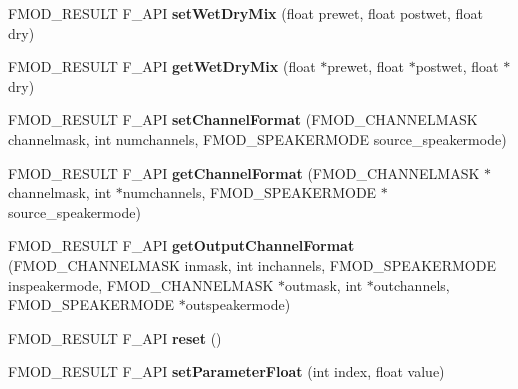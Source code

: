 \begin{DoxyCompactItemize}
\item 
\hypertarget{class_f_m_o_d_1_1_d_s_p_a1070de2d840d88b7fee21aab37016053}{F\+M\+O\+D\+\_\+\+R\+E\+S\+U\+L\+T F\+\_\+\+A\+P\+I {\bfseries set\+Wet\+Dry\+Mix} (float prewet, float postwet, float dry)}\label{class_f_m_o_d_1_1_d_s_p_a1070de2d840d88b7fee21aab37016053}

\item 
\hypertarget{class_f_m_o_d_1_1_d_s_p_a7e0ef3f97f823000de321c7f69c633b0}{F\+M\+O\+D\+\_\+\+R\+E\+S\+U\+L\+T F\+\_\+\+A\+P\+I {\bfseries get\+Wet\+Dry\+Mix} (float $\ast$prewet, float $\ast$postwet, float $\ast$dry)}\label{class_f_m_o_d_1_1_d_s_p_a7e0ef3f97f823000de321c7f69c633b0}

\item 
\hypertarget{class_f_m_o_d_1_1_d_s_p_a1cf7028a5dad21c9b25b0a1c740d9fa2}{F\+M\+O\+D\+\_\+\+R\+E\+S\+U\+L\+T F\+\_\+\+A\+P\+I {\bfseries set\+Channel\+Format} (F\+M\+O\+D\+\_\+\+C\+H\+A\+N\+N\+E\+L\+M\+A\+S\+K channelmask, int numchannels, F\+M\+O\+D\+\_\+\+S\+P\+E\+A\+K\+E\+R\+M\+O\+D\+E source\+\_\+speakermode)}\label{class_f_m_o_d_1_1_d_s_p_a1cf7028a5dad21c9b25b0a1c740d9fa2}

\item 
\hypertarget{class_f_m_o_d_1_1_d_s_p_af8188037563561808d0b4f6b5e1034aa}{F\+M\+O\+D\+\_\+\+R\+E\+S\+U\+L\+T F\+\_\+\+A\+P\+I {\bfseries get\+Channel\+Format} (F\+M\+O\+D\+\_\+\+C\+H\+A\+N\+N\+E\+L\+M\+A\+S\+K $\ast$channelmask, int $\ast$numchannels, F\+M\+O\+D\+\_\+\+S\+P\+E\+A\+K\+E\+R\+M\+O\+D\+E $\ast$source\+\_\+speakermode)}\label{class_f_m_o_d_1_1_d_s_p_af8188037563561808d0b4f6b5e1034aa}

\item 
\hypertarget{class_f_m_o_d_1_1_d_s_p_a51940a26a921a03694ace53f63a92e22}{F\+M\+O\+D\+\_\+\+R\+E\+S\+U\+L\+T F\+\_\+\+A\+P\+I {\bfseries get\+Output\+Channel\+Format} (F\+M\+O\+D\+\_\+\+C\+H\+A\+N\+N\+E\+L\+M\+A\+S\+K inmask, int inchannels, F\+M\+O\+D\+\_\+\+S\+P\+E\+A\+K\+E\+R\+M\+O\+D\+E inspeakermode, F\+M\+O\+D\+\_\+\+C\+H\+A\+N\+N\+E\+L\+M\+A\+S\+K $\ast$outmask, int $\ast$outchannels, F\+M\+O\+D\+\_\+\+S\+P\+E\+A\+K\+E\+R\+M\+O\+D\+E $\ast$outspeakermode)}\label{class_f_m_o_d_1_1_d_s_p_a51940a26a921a03694ace53f63a92e22}

\item 
\hypertarget{class_f_m_o_d_1_1_d_s_p_ae475150cbc68d5ad5e5be5791ec3961a}{F\+M\+O\+D\+\_\+\+R\+E\+S\+U\+L\+T F\+\_\+\+A\+P\+I {\bfseries reset} ()}\label{class_f_m_o_d_1_1_d_s_p_ae475150cbc68d5ad5e5be5791ec3961a}

\item 
\hypertarget{class_f_m_o_d_1_1_d_s_p_a19bab08a4e41005148f14c1db2040f72}{F\+M\+O\+D\+\_\+\+R\+E\+S\+U\+L\+T F\+\_\+\+A\+P\+I {\bfseries set\+Parameter\+Float} (int index, float value)}\label{class_f_m_o_d_1_1_d_s_p_a19bab08a4e41005148f14c1db2040f72}


\end{DoxyCompactItemize}
